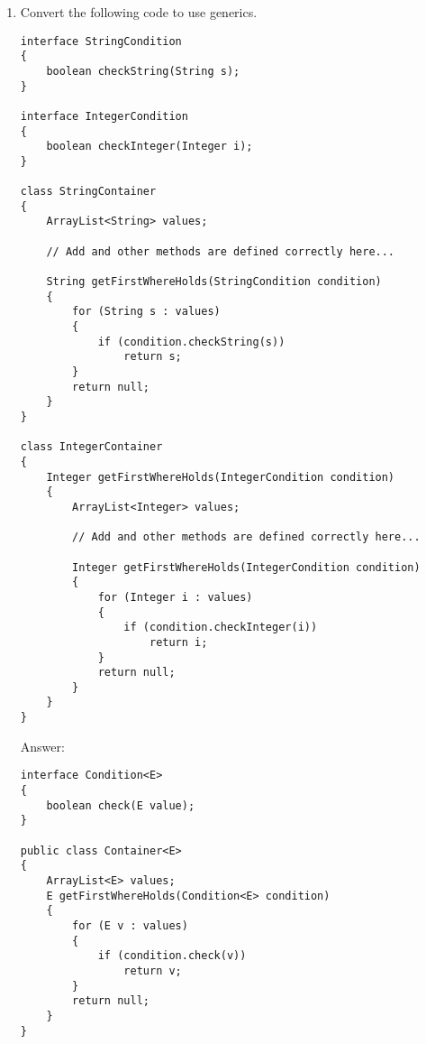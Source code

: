 \documentclass[11pt]{article}
\newenvironment{answer}{\large\lstset{basicstyle=\large\ttfamily}\color{white} \small{Answer:}}{}
\newenvironment{answer}{\large\lstset{basicstyle=\large\ttfamily}\color{red} \small{Answer:}}{}
\begin{document}
\begin{enumerate}
\begin{enumerate}
\item Dorothy also wrote the stub for the {\tt get()} method but didn't finish it. Complete the rest of it for her. You can return {\tt -1} if the key is not found in the hash map. \\
{\tt public int get( String key ) \{ } \\
\begin{answer} 
	\begin{lstlisting}
	int hashIndex = badHash( key );
	// if key is not in table, return -1
	if ( table.get( hashIndex ) == null ) {
		return -1;
	}
	LinkedNode current = table.get( hashIndex );
	while ( current.getNext() != null 
		&& !current.getKey().equals( key ) ) {
		current = current.getNext();
	}
	if ( current.getKey().equals( key) ) {
		return current.getValue();
	}
	else {
		// We looped thru the entire list and didn't find it
		return -1;
	}
}
	\end{lstlisting}
\end{answer}
\end{enumerate}


\item Convert the following code to use generics.
\begin{lstlisting}
interface StringCondition
{
	boolean checkString(String s);
}

interface IntegerCondition
{
	boolean checkInteger(Integer i);
}

class StringContainer
{
	ArrayList<String> values;
	
	// Add and other methods are defined correctly here...

	String getFirstWhereHolds(StringCondition condition)
	{
		for (String s : values)
		{
			if (condition.checkString(s))
				return s;
		}
		return null;
	}
}

class IntegerContainer
{
	Integer getFirstWhereHolds(IntegerCondition condition)
	{
		ArrayList<Integer> values;

		// Add and other methods are defined correctly here...

		Integer getFirstWhereHolds(IntegerCondition condition)
		{
			for (Integer i : values)
			{
				if (condition.checkInteger(i))
					return i;
			}
			return null;
		}
	}
}
\end{lstlisting}

\begin{answer}
\begin{lstlisting}
interface Condition<E>
{
	boolean check(E value);
}

public class Container<E>
{
	ArrayList<E> values;
	E getFirstWhereHolds(Condition<E> condition)
	{
		for (E v : values)
		{
			if (condition.check(v))
				return v;
		}
		return null;
	}
}
\end{lstlisting}
\end{answer}

\end{enumerate}
\end{document}
